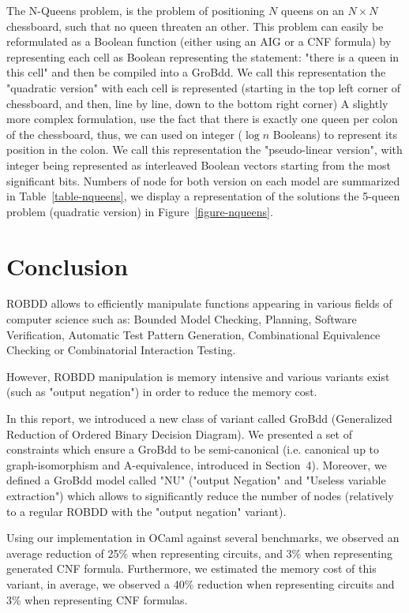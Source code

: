 \documentclass[a4paper,10pt]{article}
\begin{document}
The N-Queens problem, is the problem of positioning $N$ queens on an $N\times N$ chessboard, such that no queen threaten an other.
This problem can easily be reformulated as a Boolean function (either using an AIG or a CNF formula) by representing each cell as Boolean representing the statement: "there is a queen in this cell" and then be compiled into a GroBdd.
We call this representation the "quadratic version" with each cell is represented (starting in the top left corner of chessboard, and then, line by line, down to the bottom right corner)
A slightly more complex formulation, use the fact that there is exactly one queen per colon of the chessboard, thus, we can used on integer ($\log n$ Booleans) to represent its position in the colon.
We call this representation the "pseudo-linear version", with integer being represented as interleaved Boolean vectors starting from the most significant bits.
Numbers of node for both version on each model are summarized in Table~\ref{table-nqueens}, we display a representation of the solutions the 5-queen problem (quadratic version) in Figure~\ref{figure-nqueens}.



\section{Conclusion}

ROBDD allows to efficiently manipulate functions appearing in various fields of computer science such as: Bounded Model Checking, Planning, Software Verification, Automatic Test Pattern Generation, Combinational Equivalence Checking or Combinatorial Interaction Testing.

However, ROBDD manipulation is memory intensive and various variants exist (such as "output negation") in order to reduce the memory cost.

In this report, we introduced a new class of variant called GroBdd (Generalized Reduction of Ordered Binary Decision Diagram). We presented a set of constraints which ensure a GroBdd to be semi-canonical (i.e. canonical up to graph-isomorphism and A-equivalence, introduced in Section~4).
Moreover, we defined a GroBdd model called "NU" ("output Negation" and "Useless variable extraction") which allows to significantly reduce the number of nodes (relatively to a regular ROBDD with the "output negation" variant).


Using our implementation in OCaml against several benchmarks, we observed an average reduction of 25\% when representing circuits, and 3\% when representing generated CNF formula.
Furthermore, we estimated the memory cost of this variant, in average, we observed a 40\% reduction when representing circuits and 3\% when representing CNF formulas.
\end{document}

